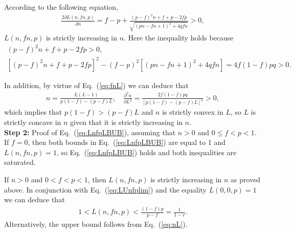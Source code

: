 \documentclass[aop]{imsart}
\theoremstyle{plain}
\theoremstyle{remark}
\newcommand{\1}{\operatorname{\uppercase\expandafter{\romannumeral1}}}
\newcommand{\2}{\operatorname{\uppercase\expandafter{\romannumeral2}}}
\newcommand{\3}{\operatorname{\uppercase\expandafter{\romannumeral3}}}
\newcommand{\4}{\operatorname{\uppercase\expandafter{\romannumeral4}}}
\newcommand{\5}{\operatorname{\uppercase\expandafter{\romannumeral5}}}
\newcommand{\6}{\operatorname{\uppercase\expandafter{\romannumeral6}}}
\newcommand{\7}{\operatorname{\uppercase\expandafter{\romannumeral7}}}
\newcommand{\8}{\operatorname{\uppercase\expandafter{\romannumeral8}}}
\newcommand{\9}{\operatorname{\uppercase\expandafter{\romannumeral9}}}
\newcommand{\eref}[1]{Eq.~\textup{(\ref{#1})}}
\begin{document}
\begin{appendix}
	
	According to the following equation,
	\begin{align}
	\frac{2\partial L(n,f n,p)}{\partial n}=f-p +\frac{(p-f)^2n+f+p-2fp }{\sqrt{(p n-f n+1)^2+4q f n}}>0,
	\end{align}
	$L(n,f n,p)$ is strictly increasing in $n$. Here the inequality holds because
	\begin{gather}
	(p-f)^2n+f+p-2fp>0,\\
	[(p-f)^2n+f+p-2fp]^2-(f-p)^2[(p n-f n+1)^2+4q f n]=4f(1-f)p q >0.
	\end{gather}

	In addition, by virtue of \eref{eq:fnL} we can deduce  that 
	\begin{align}
	n=\frac{L(L-1)}{p(1-f)-(p-f)L},\quad \frac{\partial^2 n }{\partial L^2}=\frac{2f(1-f)p q }{[p(1-f)-(p-f)L]^3}>0, \label{eq:nL}
	\end{align}
	which implies that $p(1-f)>(p-f)L$ and $n$ is strictly convex in $L$, so $L$  is strictly  concave in $n$ given that it is strictly increasing in $n$.\\
	
\textbf{Step 2:} Proof of \eref{eq:LnfpLBUB}, assuming that $n>0$ and $0\leq f<p<1$. If $f=0$, then both bounds in \eref{eq:LnfpLBUB} are equal to 1 and $L(n,f n,p)=1$, so \eref{eq:LnfpLBUB} holds and both inequalities are saturated. 



If $n>0$ and $0< f<p<1$, then $L(n,f n,p)$
is strictly increasing in $n$ as proved above. 	In conjunction with \eref{eq:LUnfplim} and the equality $L(0,0,p)=1$
we can deduce that 
\begin{gather}\label{eq:LnfpLBUBproof}
1< L(n,f n,p)< \frac{(1-f)p}{p-f}=\frac{1}{1-r}.
\end{gather}
Alternatively, the upper bound follows from \eref{eq:nL}. 


\end{appendix}
\end{document}
